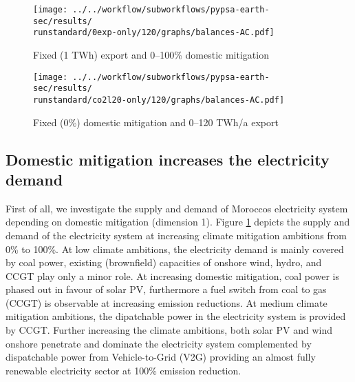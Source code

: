 \begin{figure*}[h!]
    \centering
    \begin{subfigure}[b]{0.49\linewidth}
        \centering
        \texttt{[image: ../../workflow/subworkflows/pypsa-earth-sec/results/\\runstandard/0exp-only/120/graphs/balances-AC.pdf]}
        \caption{Fixed (1 TWh) export and 0--100\% domestic mitigation}
        \label{fig:balances-ac-0exp-120}
    \end{subfigure}
    \hfill
    \begin{subfigure}[b]{0.49\linewidth}
        \centering
        \texttt{[image: ../../workflow/subworkflows/pypsa-earth-sec/results/\\runstandard/co2l20-only/120/graphs/balances-AC.pdf]}
        \caption{Fixed (0\%) domestic mitigation and 0--120 TWh/a export}
        \label{fig:balances-ac-co2l20-120}
    \end{subfigure}
    \hfill
    \caption{Electricity supply and demand at fixed export levels and increasing domestic mitigation export (\ref{fig:balances-ac-0exp-120}) and vice versa (\ref{fig:balances-ac-co2l20-120}). Increasing domestic mitigation first phases out carbon-intensive coal generation in favor of CCGT, at medium to high mitigation the electricity system is fully renewable supported by flexibility through V2G and sector coupling. Increasing electricity demands cover EVs and hydrogen generation for other sectors.
    At increasing hydrogen exports the additional electricity required for hydrogen electrolysis is covered by onshore wind and solar PV, as imposed by the hydrogen regulation. 
    }
    \label{fig:balances-ac}
\end{figure*}


\subsection*{Domestic mitigation increases the electricity demand}
\label{subsec:increase_limit}
First of all, we investigate the supply and demand of Moroccos electricity system depending on domestic mitigation (dimension 1). Figure \ref{fig:balances-ac-0exp-120} depicts the supply and demand of the electricity system at increasing climate mitigation ambitions from 0\% to 100\%. At low climate ambitions, the electricity demand is mainly covered by coal power, existing (brownfield) capacities of onshore wind, hydro, and CCGT play only a minor role. 
At increasing domestic mitigation, coal power is phased out in favour of solar PV, furthermore a fuel switch from coal to gas (CCGT) is observable at increasing emission reductions. At medium climate mitigation ambitions, the dipatchable power in the electricity system is provided by CCGT. 
Further increasing the climate ambitions, both solar PV and wind onshore penetrate and dominate the electricity system complemented by dispatchable power from Vehicle-to-Grid (V2G) providing an almost fully renewable electricity sector at 100\% emission reduction. 

